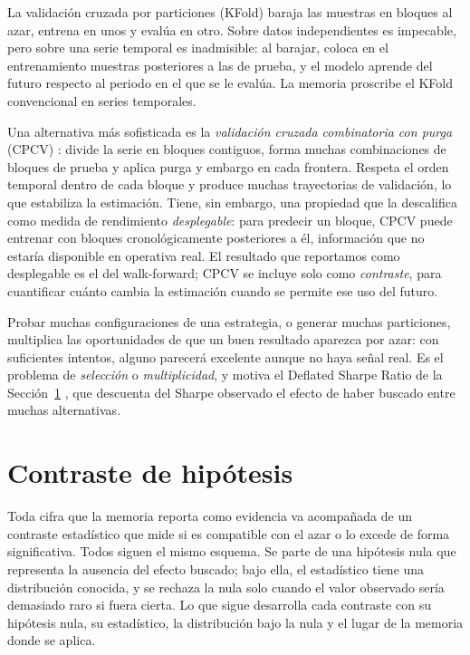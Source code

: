 La validación cruzada por particiones (KFold) baraja las muestras en bloques al azar, entrena en unos y evalúa en otro. Sobre datos independientes es impecable, pero sobre una serie temporal es inadmisible: al barajar, coloca en el entrenamiento muestras posteriores a las de prueba, y el modelo aprende del futuro respecto al periodo en el que se le evalúa. La memoria proscribe el KFold convencional en series temporales.

Una alternativa más sofisticada es la \emph{validación cruzada combinatoria con purga} (CPCV) \cite{lopezdeprado2018}: divide la serie en bloques contiguos, forma muchas combinaciones de bloques de prueba y aplica purga y embargo en cada frontera. Respeta el orden temporal dentro de cada bloque y produce muchas trayectorias de validación, lo que estabiliza la estimación. Tiene, sin embargo, una propiedad que la descalifica como medida de rendimiento \emph{desplegable}: para predecir un bloque, CPCV puede entrenar con bloques cronológicamente posteriores a él, información que no estaría disponible en operativa real. El resultado que reportamos como desplegable es el del walk-forward; CPCV se incluye solo como \emph{contraste}, para cuantificar cuánto cambia la estimación cuando se permite ese uso del futuro.

Probar muchas configuraciones de una estrategia, o generar muchas particiones, multiplica las oportunidades de que un buen resultado aparezca por azar: con suficientes intentos, alguno parecerá excelente aunque no haya señal real. Es el problema de \emph{selección} o \emph{multiplicidad}, y motiva el Deflated Sharpe Ratio de la Sección~\ref{sec:tests} \cite{bailey2014}, que descuenta del Sharpe observado el efecto de haber buscado entre muchas alternativas.

\section{Contraste de hipótesis}
\label{sec:tests}

Toda cifra que la memoria reporta como evidencia va acompañada de un contraste estadístico que mide si es compatible con el azar o lo excede de forma significativa. Todos siguen el mismo esquema. Se parte de una hipótesis nula que representa la ausencia del efecto buscado; bajo ella, el estadístico tiene una distribución conocida, y se rechaza la nula solo cuando el valor observado sería demasiado raro si fuera cierta. Lo que sigue desarrolla cada contraste con su hipótesis nula, su estadístico, la distribución bajo la nula y el lugar de la memoria donde se aplica.

